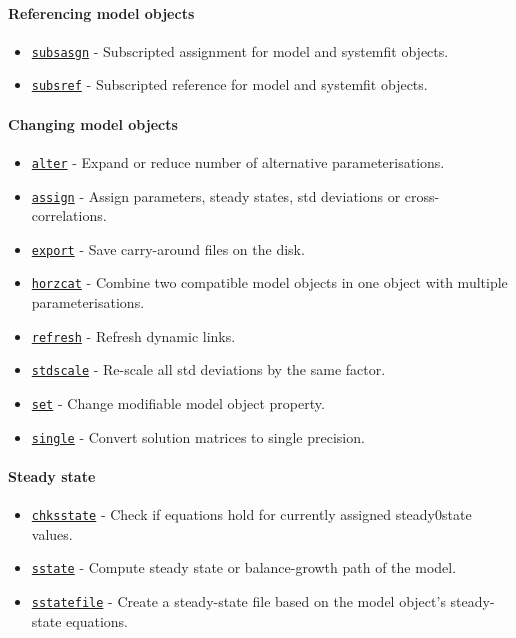  \paragraph{Referencing model objects}
 
 \begin{itemize}
 \item
   \href{model/subsasgn}{\texttt{subsasgn}} - Subscripted assignment for
   model and systemfit objects.
 \item
   \href{model/subsref}{\texttt{subsref}} - Subscripted reference for
   model and systemfit objects.
 \end{itemize}
 
 \paragraph{Changing model objects}
 
 \begin{itemize}
 \item
   \href{model/alter}{\texttt{alter}} - Expand or reduce number of
   alternative parameterisations.
 \item
   \href{model/assign}{\texttt{assign}} - Assign parameters, steady
   states, std deviations or cross-correlations.
 \item
   \href{model/export}{\texttt{export}} - Save carry-around files on the
   disk.
 \item
   \href{model/horzcat}{\texttt{horzcat}} - Combine two compatible model
   objects in one object with multiple parameterisations.
 \item
   \href{model/refresh}{\texttt{refresh}} - Refresh dynamic links.
 \item
   \href{model/stdscale}{\texttt{stdscale}} - Re-scale all std deviations
   by the same factor.
 \item
   \href{model/set}{\texttt{set}} - Change modifiable model object
   property.
 \item
   \href{model/single}{\texttt{single}} - Convert solution matrices to
   single precision.
 \end{itemize}
 
 \paragraph{Steady state}
 
 \begin{itemize}
 \item
   \href{model/chksstate}{\texttt{chksstate}} - Check if equations hold
   for currently assigned steady0state values.
 \item
   \href{model/sstate}{\texttt{sstate}} - Compute steady state or
   balance-growth path of the model.
 \item
   \href{model/sstatefile}{\texttt{sstatefile}} - Create a steady-state
   file based on the model object's steady-state equations.
 \end{itemize}
 
